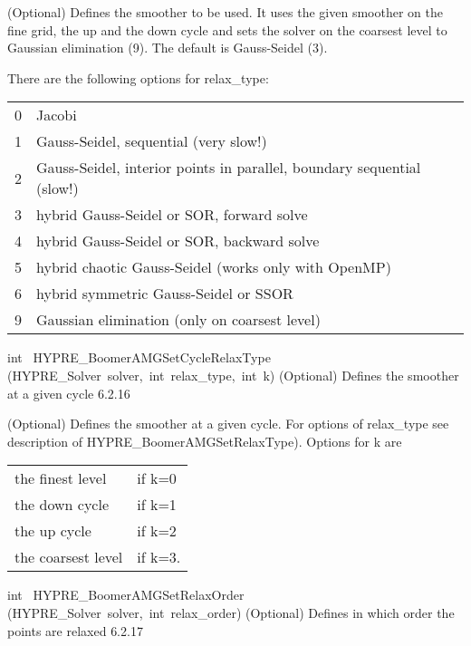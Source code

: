 \documentclass{article}
\begin{document}
\begin{cxxentry}
\begin{cxxentry}
\begin{cxxfunction}
\begin{cxxdoc}
(Optional) Defines the smoother to be used. It uses the given
smoother on the fine grid, the up and 
the down cycle and sets the solver on the coarsest level to Gaussian
elimination (9). The default is Gauss-Seidel (3).

There are the following options for relax\_type:

\begin{tabular}{|c|l|} \hline
0 &	Jacobi \\
1 &	Gauss-Seidel, sequential (very slow!) \\
2 &	Gauss-Seidel, interior points in parallel, boundary sequential (slow!) \\
3 &	hybrid Gauss-Seidel or SOR, forward solve \\
4 &	hybrid Gauss-Seidel or SOR, backward solve \\
5 &	hybrid chaotic Gauss-Seidel (works only with OpenMP) \\
6 &	hybrid symmetric Gauss-Seidel or SSOR \\
9 &	Gaussian elimination (only on coarsest level) \\
\hline
\end{tabular}
\end{cxxdoc}
\end{cxxfunction}
\begin{cxxfunction}
{int\ }
        {HYPRE\_BoomerAMGSetCycleRelaxType}
        {(HYPRE\_Solver\ solver,\ int\ relax\_type,\ int\ k)}
        {
(Optional) Defines the smoother at a given cycle}
        {6.2.16}
\begin{cxxdoc}

(Optional) Defines the smoother at a given cycle.
For options of relax\_type see
description of HYPRE\_BoomerAMGSetRelaxType). Options for k are

\begin{tabular}{|l|l|} \hline
the finest level &	if k=0 \\
the down cycle &	if k=1 \\
the up cycle	&	if k=2 \\
the coarsest level &  if k=3. \\
\hline
\end{tabular}
\end{cxxdoc}
\end{cxxfunction}
\begin{cxxfunction}
{int\ }
        {HYPRE\_BoomerAMGSetRelaxOrder}
        {(HYPRE\_Solver\ solver,\ int\ relax\_order)}
        {
(Optional) Defines in which order the points are relaxed}
        {6.2.17}
\begin{cxxdoc}


\end{cxxdoc}
\end{cxxfunction}
\end{cxxentry}
\end{cxxentry}
\end{document}
